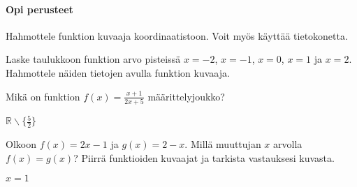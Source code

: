 \begin{tehtavasivu}

\paragraph*{Opi perusteet}

\begin{tehtava}
Hahmottele funktion kuvaaja koordinaatistoon. Voit myös käyttää tietokonetta.
\begin{alakohdat}
\end{alakohdat}

\end{tehtava}

\begin{tehtava}
  Laske taulukkoon funktion arvo pisteissä $x=-2$, $x=-1$, $x=0$, $x=1$ ja $x=2$. Hahmottele näiden tietojen avulla funktion kuvaaja.
  \begin{alakohdat}
  \end{alakohdat}

  \begin{vastaus}
    \begin{alakohdat}
    \end{alakohdat}
  \end{vastaus}
\end{tehtava}

\begin{tehtava} %
  Mikä on funktion $f(x)=\frac{x+1}{2x+5}$ määrittelyjoukko?

  \begin{vastaus}
   $\mathbb{R} \backslash \lbrace \frac{5}{2} \rbrace$
  \end{vastaus}

\end{tehtava}

\begin{tehtava} %
	Olkoon $f(x) = 2x-1$ ja $g(x) = 2-x$. Millä muuttujan \(x\) arvolla $f(x) = g(x)$? Piirrä funktioiden kuvaajat ja tarkista vastauksesi kuvasta.
    \begin{vastaus}
    $ x = 1 $
    \end{vastaus}
\end{tehtava}


\end{tehtavasivu}
